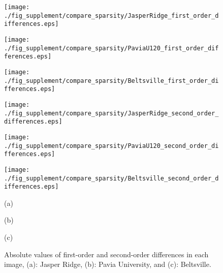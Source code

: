 \begin{figure*}[t]
	\begin{center}
		\begin{minipage}{0.295\hsize}
			\centerline{\texttt{[image: ./fig\_supplement/compare\_sparsity/JasperRidge\_first\_order\_differences.eps]}}
		\end{minipage}
		\begin{minipage}{0.295\hsize}
			\centerline{\texttt{[image: ./fig\_supplement/compare\_sparsity/PaviaU120\_first\_order\_differences.eps]}}
		\end{minipage}
		\begin{minipage}{0.295\hsize}
			\centerline{\texttt{[image: ./fig\_supplement/compare\_sparsity/Beltsville\_first\_order\_differences.eps]}}
		\end{minipage}
		
		\vspace{1mm}
		
		\begin{minipage}{0.295\hsize}
			\centerline{\texttt{[image: ./fig\_supplement/compare\_sparsity/JasperRidge\_second\_order\_differences.eps]}}
		\end{minipage}
		\begin{minipage}{0.295\hsize}
			\centerline{\texttt{[image: ./fig\_supplement/compare\_sparsity/PaviaU120\_second\_order\_differences.eps]}}
		\end{minipage}
		\begin{minipage}{0.295\hsize}
			\centerline{\texttt{[image: ./fig\_supplement/compare\_sparsity/Beltsville\_second\_order\_differences.eps]}}
		\end{minipage}
		
		\begin{minipage}{0.005\hsize}
			\centerline{\hspace{\hsize}} %
		\end{minipage}
		\begin{minipage}{0.295\hsize}
			\centerline{\small{(a)}}
		\end{minipage}
		\begin{minipage}{0.295\hsize}
			\centerline{\small{(b)}}
		\end{minipage}
		\begin{minipage}{0.295\hsize}
			\centerline{\small{(c)}}
		\end{minipage}
		
	\end{center}
	
	\caption{Absolute values of first-order and second-order differences in each image, (a): Jasper Ridge, (b): Pavia University, and (c): Beltsville.}
	
	\label{fig:comparison_sparsity}
\end{figure*}